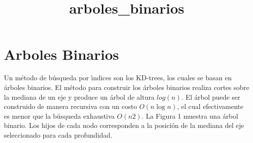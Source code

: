 \documentclass[11pt]{article}
\title{arboles\_binarios}
\begin{document}
    
    
    \maketitle
    
    

    
    \section{Arboles Binarios}\label{arboles-binarios}

Un método de búsqueda por ı́ndices son los KD-trees, los cuales se basan
en árboles binarios. El método para construir los árboles binarios
realiza cortes sobre la mediana de un eje y produce un árbol de altura
\(log(n)\). El árbol puede ser construido de manera recursiva con un
costo \(O(n \operatorname{log} n)\), el cual efectivamente es menor que
la búsqueda exhaustiva \(O(n2)\). La Figura 1 muestra una árbol binario.
Los hijos de cada nodo corresponden a la posición de la mediana del eje
seleccionado para cada profundidad.
\end{document}
